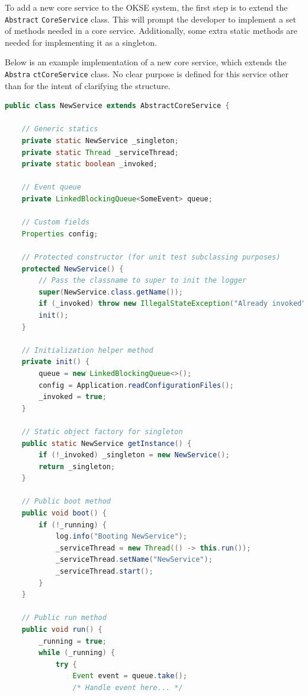 To add a new core service to the OKSE system, the first step is to extend the \verb!Abstract! \verb!CoreService! class. This will prompt the developer to implement a set of methods needed in a core service. Additionally, some extra static methods are needed for implementing it as a singleton.

Below is an example implementation of a new core service, which extends the \verb!Abstra! \verb!ctCoreService! class. No clear purpose is defined for this service other than for the intent of clarifying the structure.

\begin{lstlisting}[language=Java, captionpos=b, caption=Creating a new core service, frame=bt, showstringspaces=false]
public class NewService extends AbstractCoreService {

    // Generic statics
    private static NewService _singleton;
    private static Thread _serviceThread;
    private static boolean _invoked;
    
    // Event queue
    private LinkedBlockingQueue<SomeEvent> queue;
    
    // Custom fields
    Properties config;
    
    // Protected constructor (for unit test subclassing purposes)
    protected NewService() {
        // Pass the classname to super to init the logger
        super(NewService.class.getName());
        if (_invoked) throw new IllegalStateException("Already invoked");
        init();
    }
    
    // Initialization helper method
    private init() {
        queue = new LinkedBlockingQueue<>();
        config = Application.readConfigurationFiles();
        _invoked = true;
    }
    
    // Static object factory for singleton
    public static NewService getInstance() {
        if (!_invoked) _singleton = new NewService();
        return _singleton;
    }
    
    // Public boot method
    public void boot() {
        if (!_running) {
            log.info("Booting NewService");
            _serviceThread = new Thread(() -> this.run());
            _serviceThread.setName("NewService");
            _serviceThread.start();
        }
    }
    
    // Public run method
    public void run() {
        _running = true;
        while (_running) {
            try {
                Event event = queue.take();
                /* Handle event here... */
                

\end{lstlisting}
